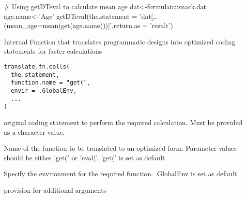\documentclass[a4paper]{book}
\begin{document}
%
\begin{Examples}
\begin{ExampleCode}
# Using getDTeval to calculate mean age
dat<-formulaic::snack.dat
age.name<-'Age'
getDTeval(the.statement = 'dat[,.(mean_age=mean(get(age.name)))]',return.as = 'result')
\end{ExampleCode}
\end{Examples}
%
\begin{Description}\relax
Internal Function that translates programmatic designs into optimized coding statements for faster calculations
\end{Description}
%
\begin{Usage}
\begin{verbatim}
translate.fn.calls(
  the.statement,
  function.name = "get(",
  envir = .GlobalEnv,
  ...
)
\end{verbatim}
\end{Usage}
%
\begin{Arguments}
\begin{ldescription}
\item[\code{the.statement}] original coding statement to perform the required calculation. Must be provided as a character value.

\item[\code{function.name}] Name of the function to be translated to an optimized form. Parameter values should be either 'get(' or 'eval('. 'get(' is set as default

\item[\code{envir}] Specify the environment for the required function. .GlobalEnv is set as default

\item[\code{...}] provision for additional arguments
\end{ldescription}
\end{Arguments}
\printindex{}
\end{document}

